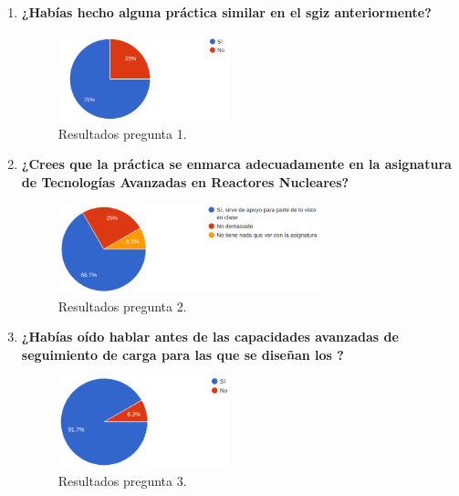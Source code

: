\begin{enumerate}
    \item \textbf{¿Habías hecho alguna práctica similar en el \acrshort{sgiz} anteriormente?}
    
    \begin{figure}[!h]
        \centering
        \includegraphics[width=0.47\textwidth]{content/figures/encuesta_1.png}
        \caption{Resultados pregunta 1.}
        \label{fig:encuesta_1}
    \end{figure}

    \item \textbf{¿Crees que la práctica se enmarca adecuadamente en la asignatura de Tecnologías Avanzadas en Reactores Nucleares?}
    
    \begin{figure}[!h]
        \centering
        \includegraphics[width=0.72\textwidth]{content/figures/encuesta_2.png}
        \caption{Resultados pregunta 2.}
        \label{fig:encuesta_2}
    \end{figure}
    
    \item \textbf{¿Habías oído hablar antes de las capacidades avanzadas de seguimiento de carga para las que se diseñan los ?}
    
    \begin{figure}[!h]
        \centering
        \includegraphics[width=0.47\textwidth]{content/figures/encuesta_3.png}
        \caption{Resultados pregunta 3.}
        \label{fig:encuesta_3}
    \end{figure}
    

\end{enumerate}

